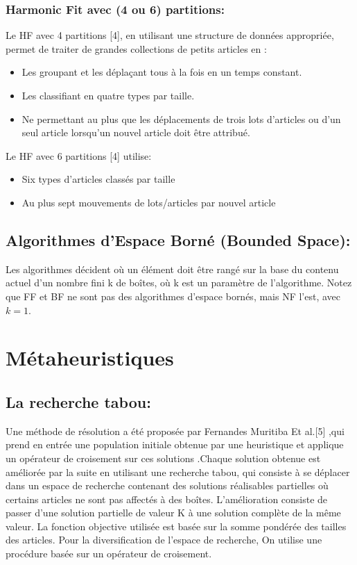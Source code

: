 \documentclass[class=report, crop=false]{standalone}
\begin{document}
        \subsubsection{Harmonic Fit avec (4 ou 6) partitions: }
        Le HF avec 4 partitions [4], en utilisant une structure de données appropriée, permet de traiter de grandes collections de petits articles en :
        \renewcommand{\labelitemi}{$\circ$}  
        \begin{itemize}
            \item Les groupant et les déplaçant tous à la fois en un temps constant.
            \item Les classifiant en quatre types par taille.
            \item Ne permettant au plus que les déplacements de trois lots d’articles ou d'un seul article lorsqu'un nouvel article doit être attribué.
        \end{itemize}
        Le HF avec 6 partitions [4] utilise:
        \renewcommand{\labelitemi}{$\circ$}  
        \begin{itemize}
            \item Six types d'articles classés par taille
            \item Au plus sept mouvements de lots/articles par nouvel article
        \end{itemize}
        \subsection{Algorithmes d’Espace Borné (Bounded Space):}
        Les algorithmes décident où un élément doit être rangé sur la base du contenu actuel d'un nombre fini k de boîtes, où k est un paramètre de l'algorithme. Notez que FF et BF ne sont pas des algorithmes d'espace bornés, mais NF l'est, avec \(k = 1\).
        \section{Métaheuristiques}
        \subsection{La recherche tabou: }
        Une méthode de résolution a été proposée par Fernandes Muritiba Et al.[5] ,qui prend en entrée une population initiale obtenue par une heuristique et applique un opérateur de croisement sur ces solutions .Chaque solution obtenue est améliorée par la suite en utilisant une recherche tabou, qui consiste à  se déplacer dans un espace de recherche contenant des solutions réalisables  partielles où certains articles ne sont pas affectés à des boîtes. L’amélioration consiste de passer d’une solution partielle de valeur K à une solution complète de la même valeur. La fonction objective utilisée est basée sur la somme pondérée des tailles des articles.
Pour la diversification de l’espace de recherche, On utilise une procédure basée sur un opérateur de croisement.
\end{document}
